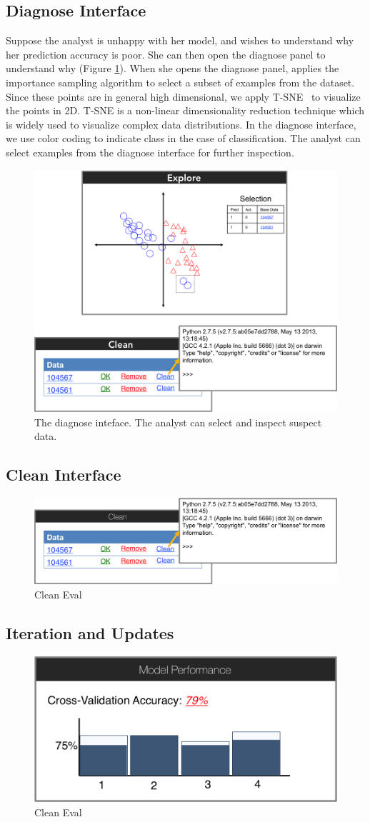 \subsection{Diagnose Interface}
Suppose the analyst is unhappy with her model, and wishes to understand why her prediction accuracy is poor.
She can then open the diagnose panel to understand why (Figure \ref{diag}).
When she opens the diagnose panel, \sys applies the importance sampling algorithm to select a subset of examples from the dataset.
Since these points are in general high dimensional, we apply T-SNE~\cite{van2008visualizing} to visualize the points in 2D.
T-SNE is a non-linear dimensionality reduction technique which is widely used to visualize complex data distributions.
In the diagnose interface, we use color coding to indicate class in the case of classification.
The analyst can select examples from the diagnose interface for further inspection.

\begin{figure}[t]
\centering
 \includegraphics[width=0.6\columnwidth]{figs/interface3.png}
 \caption{The diagnose inteface. The analyst can select and inspect suspect data. \label{diag}}
\end{figure}

\subsection{Clean Interface}

\begin{figure}[t]
\centering
 \includegraphics[width=\columnwidth]{figs/interface4.png}
 \caption{Clean Eval}
\end{figure}

\subsection{Iteration and Updates}

\begin{figure}[t]
\centering
 \includegraphics[width=0.6\columnwidth]{figs/interface5.png}
 \caption{Clean Eval}
\end{figure}